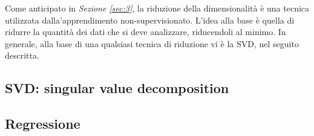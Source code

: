 \documentclass{subfiles}
\begin{document}
Come anticipato in \emph{Sezione \ref{sec:3}}, la riduzione della dimensionalità è una tecnica utilizzata dalla'apprendimento non-supervisionato.
L'idea alla base è quella di ridurre la quantità dei dati che si deve analizzare, riducendoli al minimo.
In generale, alla base di una qualsiasi tecnica di riduzione vi è la SVD, nel seguito descritta.

\subsection{SVD: singular value decomposition}

\clearpage

\subsection{Regressione}

\end{document}

